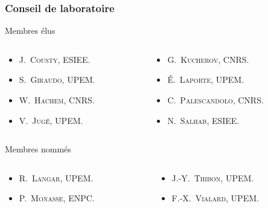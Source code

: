 \documentclass[]{beamer}
\begin{document}
\begin{frame}
  \frametitle{Conseil de laboratoire}

  \begin{block}{Membres élus}
    \begin{columns}
      \begin{column}{0.5\textwidth}
        \begin{itemize}
          \item \textsc{J.~Cousty}, ESIEE.
          \item \textsc{S.~Giraudo}, UPEM.
          \item \textsc{W.~Hachem}, CNRS.
          \item \textsc{V.~Jugé}, UPEM.
        \end{itemize}
      \end{column}
      \begin{column}{0.5\textwidth}
        \begin{itemize}
          \item \textsc{G.~Kucherov}, CNRS.
          \item \textsc{\'E.~Laporte}, UPEM.
          \item \textsc{C.~Palescandolo}, CNRS.
          \item \textsc{N.~Salhab}, ESIEE.
        \end{itemize}
      \end{column}
    \end{columns}
  \end{block}

  \begin{block}{Membres nommés}
    \begin{columns}
      \begin{column}{0.5\textwidth}
        \begin{itemize}
          \item \textsc{R.~Langar}, UPEM.
          \item \textsc{P.~Monasse}, ENPC.
        \end{itemize}
      \end{column}
      \begin{column}{0.5\textwidth}
        \begin{itemize}
          \item \textsc{J.-Y.~Thibon}, UPEM.
          \item \textsc{F.-X.~Vialard}, UPEM.
        \end{itemize}
      \end{column}
    \end{columns}
  \end{block}


\end{frame}
\end{document}
